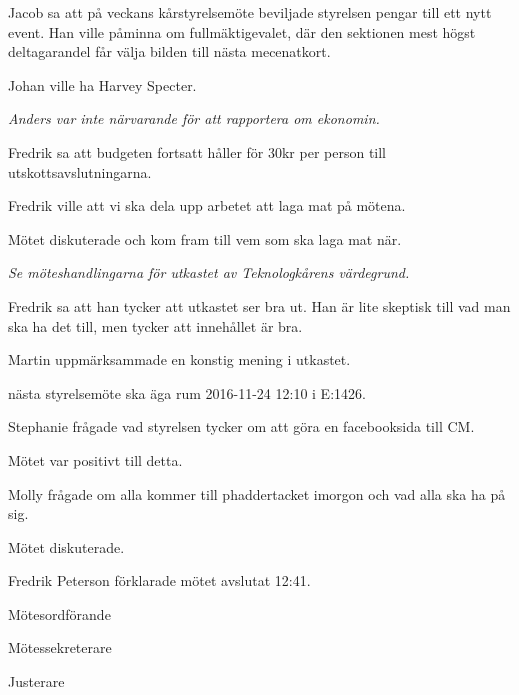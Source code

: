 \documentclass[10pt]{article}
\def\mo{Fredrik Peterson}
\def\ms{Erik Månsson}
\def\ji{Martin Gemborn Nilsson}
\begin{document}
\begin{paragrafer}
\begin{paragrafer}
Jacob sa att på veckans kårstyrelsemöte beviljade styrelsen pengar till ett nytt event. Han ville påminna om fullmäktigevalet, där den sektionen mest högst deltagarandel får välja bilden till nästa mecenatkort.

Johan ville ha Harvey Specter.

\emph{Anders var inte närvarande för att rapportera om ekonomin.}

\end{paragrafer}

Fredrik sa att budgeten fortsatt håller för 30kr per person till utskottsavslutningarna.

Fredrik ville att vi ska dela upp arbetet att laga mat på mötena.

Mötet diskuterade och kom fram till vem som ska laga mat när.

\emph{Se möteshandlingarna för utkastet av Teknologkårens värdegrund.}

Fredrik sa att han tycker att utkastet ser bra ut. Han är lite skeptisk till vad man ska ha det till, men tycker att innehållet är bra.

Martin uppmärksammade en konstig mening i utkastet.

{\Mba} nästa styrelsemöte ska äga rum 2016-11-24 12:10 i E:1426.

{\Ibfu}

Stephanie frågade vad styrelsen tycker om att göra en facebooksida till CM.

Mötet var positivt till detta.

Molly frågade om alla kommer till phaddertacket imorgon och vad alla ska ha på sig.

Mötet diskuterade.

{\mo} förklarade mötet avslutat 12:41.

\end{paragrafer}

\hidesignfoot
\begin{signatures}{3}
\signature{\mo}{Mötesordförande}
\signature{\ms}{Mötessekreterare}
\signature{\ji}{Justerare}
\end{signatures}
\end{document}
